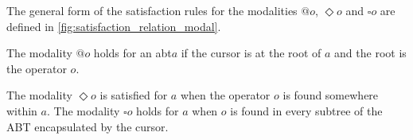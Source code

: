 \documentclass[sigplan,review]{acmart}
\newcommand{\abt}{\textsf{abt}\xspace}
\begin{document}

The general form of the satisfaction rules for the modalities $@o$,
$\Diamond o$ and $\square o$ are defined in
\cref{fig:satisfaction_relation_modal}.

The modality $@o$ holds for an \abt $a$ if the cursor is at the root of
$a$ and the root is the operator $o$. 

The modality $\Diamond o$ is satisfied for $a$ when the operator $o$ is
found somewhere within $a$. The modality
$\square o$ holds for $a$ when $o$ is found in every subtree of the
ABT encapsulated by the cursor. 
\end{document}
